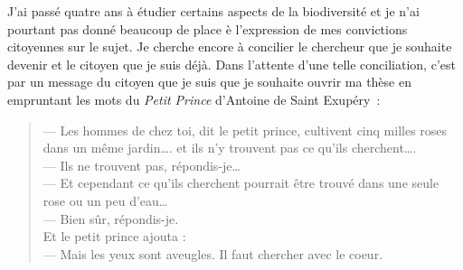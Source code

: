 J'ai passé quatre ans à étudier certains aspects de la biodiversité et
je n'ai pourtant pas donné beaucoup de place è l'expression de mes
convictions citoyennes sur le sujet. Je cherche encore à concilier le
chercheur que je souhaite devenir et le citoyen que je suis déjà. Dans
l'attente d'une telle conciliation, c'est par un message du citoyen que
je suis que je souhaite ouvrir ma thèse en empruntant les mots du
\textit{Petit Prince} d'Antoine de Saint Exupéry~:

\begin{quote}
--- Les hommes de chez toi, dit le petit prince, cultivent cinq milles
roses dans un même jardin\ldots{}. et ils n'y trouvent pas ce qu'ils
cherchent\ldots{}.\\
--- Ils ne trouvent pas, répondis-je\ldots{}\\
--- Et cependant ce qu'ils cherchent pourrait être trouvé dans une seule
rose ou un peu d'eau\ldots{}\\
--- Bien sûr, répondis-je.\\
Et le petit prince ajouta :\\
--- Mais les yeux sont aveugles. Il faut chercher avec le coeur.
\end{quote}
